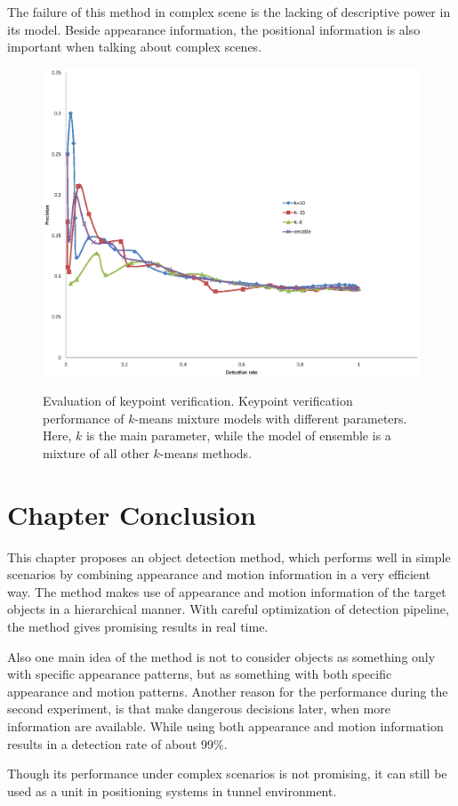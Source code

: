 The failure of this method in complex scene is the lacking of descriptive power in its model. Beside appearance information, the positional information is also important when talking about complex scenes.

\begin{figure}
\centering
{
  \includegraphics[width=1\textwidth]{kptkms.eps}
}
\caption[Evaluation of keypoint verification]{Evaluation of keypoint verification. Keypoint verification performance of $k$-means mixture models with different parameters. Here, $k$ is the main parameter, while the model of ensemble is a mixture of all other $k$-means methods.}
\label{ord:one}
\end{figure}

\section{Chapter Conclusion}
\label{conc}
 This chapter proposes an object detection method, which performs well in simple scenarios by combining appearance and motion information in a very efficient way. The method makes use of appearance and motion information of the target objects in a hierarchical manner. With careful optimization of detection pipeline, the method gives promising results in real time.

  Also one main idea of the method is not to consider objects as something only with specific appearance patterns, but as something with both
 specific appearance and motion patterns. Another reason for the performance during the second experiment, is that make dangerous decisions later, when more information are available. While using both appearance and motion information results in a detection rate of about 99\%.

 Though its performance under complex scenarios is not promising, it can still be used as a unit in  positioning systems in tunnel environment.
